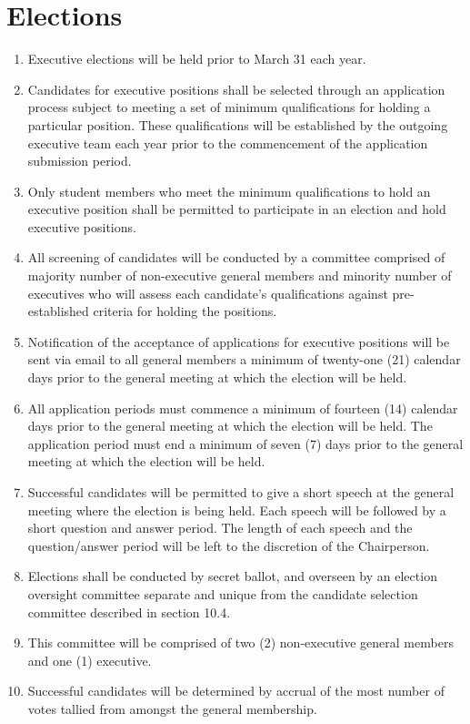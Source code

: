 \documentclass[12pt]{article}
\begin{document}
\section{Elections}
\begin{enumerate}[{10}.1]
    \item Executive elections will be held prior to March 31 each year.
    \item Candidates for executive positions shall be selected through an application process subject to meeting a set of minimum qualifications for holding a particular position. These qualifications will be established by the outgoing executive team each year prior to the commencement of the application submission period.  
    \item	Only student members who meet the minimum qualifications to hold an executive position shall be permitted to participate in an election and hold executive positions. 
    \item All screening of candidates will be conducted by a committee comprised of majority number of non-executive general members and minority number of executives who will assess each candidate’s qualifications against pre-established criteria for holding the positions.
    \item Notification of the acceptance of applications for executive positions will be sent via email to all general members a minimum of twenty-one (21) calendar days prior to the general meeting at which the election will be held. 
    \item All application periods must commence a minimum of fourteen (14) calendar days prior to the general meeting at which the election will be held. The application period must end a minimum of seven (7) days prior to the general meeting at which the election will be held. 
    \item Successful candidates will be permitted to give a short speech at the general meeting where the election is being held. Each speech will be followed by a short question and answer period. The length of each speech and the question/answer period will be left to the discretion of the Chairperson.
    \item Elections shall be conducted by secret ballot, and overseen by an election oversight committee separate and unique from the candidate selection committee described in section 10.4.  
    \item This committee will be comprised of two (2) non-executive general members and one (1) executive. 
    \item Successful candidates will be determined by accrual of the most number of votes tallied from amongst the general membership. 

\end{enumerate}
\end{document}

